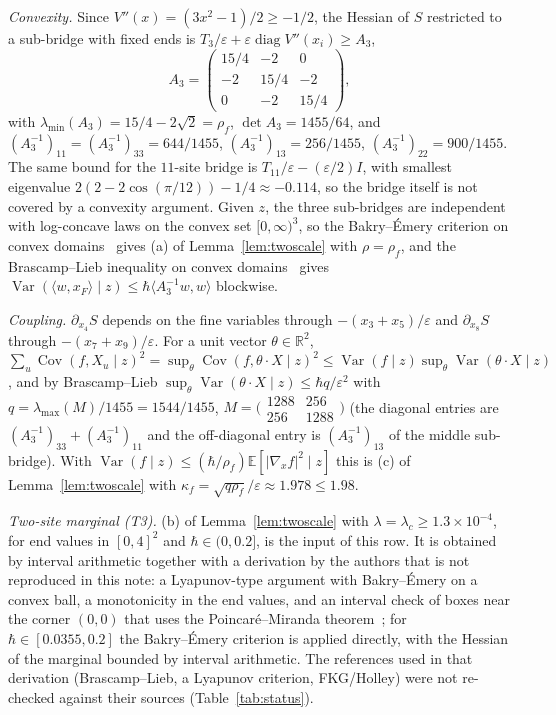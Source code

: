 \documentclass[11pt,a4paper]{article}
\theoremstyle{definition}
\theoremstyle{remark}
\newcommand{\E}{\mathbb{E}}
\DeclareMathOperator{\Cov}{Cov}
\DeclareMathOperator{\Var}{Var}
\begin{document}
\emph{Convexity.} Since $V''(x)=(3x^2-1)/2\ge-1/2$, the Hessian of $S$ restricted to a sub-bridge with fixed ends is $T_3/\varepsilon+\varepsilon\operatorname{diag}V''(x_i)\ge A_3$,
\[
A_3=\begin{pmatrix}15/4&-2&0\\-2&15/4&-2\\0&-2&15/4\end{pmatrix},
\]
with $\lambda_{\min}(A_3)=15/4-2\sqrt2=\rho_f$, $\det A_3=1455/64$, and $(A_3^{-1})_{11}=(A_3^{-1})_{33}=644/1455$, $(A_3^{-1})_{13}=256/1455$, $(A_3^{-1})_{22}=900/1455$. The same bound for the $11$-site bridge is $T_{11}/\varepsilon-(\varepsilon/2)I$, with smallest eigenvalue $2(2-2\cos(\pi/12))-1/4\approx-0.114$, so the bridge itself is not covered by a convexity argument. Given $z$, the three sub-bridges are independent with log-concave laws on the convex set $[0,\infty)^3$, so the Bakry--Émery criterion on convex domains~\cite{BE,KM} gives (a) of Lemma~\ref{lem:twoscale} with $\rho=\rho_f$, and the Brascamp--Lieb inequality on convex domains~\cite{BL,KM} gives $\Var(\langle w,x_F\rangle\mid z)\le\hbar\langle A_3^{-1}w,w\rangle$ blockwise.

\emph{Coupling.} $\partial_{x_4}S$ depends on the fine variables through $-(x_3+x_5)/\varepsilon$ and $\partial_{x_8}S$ through $-(x_7+x_9)/\varepsilon$. For a unit vector $\theta\in\mathbb R^2$, $\sum_u\Cov(f,X_u\mid z)^2=\sup_\theta\Cov(f,\theta\cdot X\mid z)^2\le\Var(f\mid z)\sup_\theta\Var(\theta\cdot X\mid z)$, and by Brascamp--Lieb $\sup_\theta\Var(\theta\cdot X\mid z)\le\hbar q/\varepsilon^2$ with $q=\lambda_{\max}(M)/1455=1544/1455$, $M=\bigl(\begin{smallmatrix}1288&256\\256&1288\end{smallmatrix}\bigr)$ (the diagonal entries are $(A_3^{-1})_{33}+(A_3^{-1})_{11}$ and the off-diagonal entry is $(A_3^{-1})_{13}$ of the middle sub-bridge). With $\Var(f\mid z)\le(\hbar/\rho_f)\E[|\nabla_xf|^2\mid z]$ this is (c) of Lemma~\ref{lem:twoscale} with $\kappa_f=\sqrt{q\rho_f}/\varepsilon\approx1.978\le1.98$.

\emph{Two-site marginal (T3).} (b) of Lemma~\ref{lem:twoscale} with $\lambda=\lambda_c\ge1.3\times10^{-4}$, for end values in $[0,4]^2$ and $\hbar\in(0,0.2]$, is the input of this row. It is obtained by interval arithmetic together with a derivation by the authors that is not reproduced in this note: a Lyapunov-type argument with Bakry--Émery on a convex ball, a monotonicity in the end values, and an interval check of boxes near the corner $(0,0)$ that uses the Poincaré--Miranda theorem~\cite{Ku}; for $\hbar\in[0.0355,0.2]$ the Bakry--Émery criterion is applied directly, with the Hessian of the marginal bounded by interval arithmetic. The references used in that derivation (Brascamp--Lieb, a Lyapunov criterion, FKG/Holley) were not re-checked against their sources (Table~\ref{tab:status}).
\end{document}
